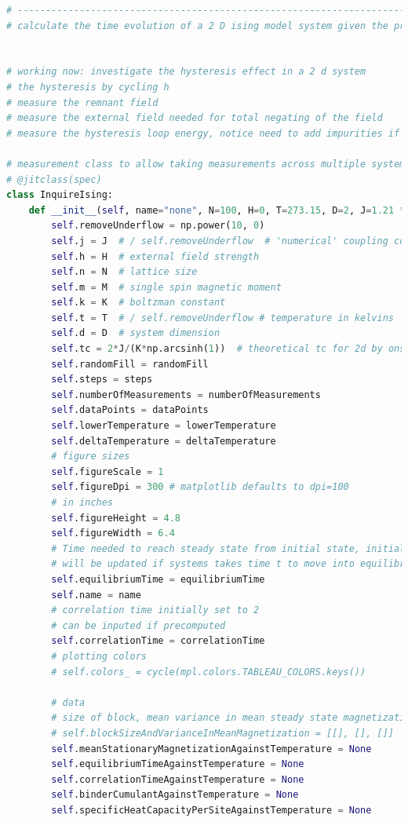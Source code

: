 \documentclass[%
showkeys,
bibnotes,
amsmath,amssymb,
floatfix,
]{revtex4-1}
\begin{document}
\begin{lstlisting}[language=Python]
# ----------------------------------------------------------------------------------------
# calculate the time evolution of a 2 D ising model system given the predefined parameters


# working now: investigate the hysteresis effect in a 2 d system
# the hysteresis by cycling h
# measure the remnant field
# measure the external field needed for total negating of the field
# measure the hysteresis loop energy, notice need to add impurities if you want a considerable amount of area enclosed

# measurement class to allow taking measurements across multiple systems
# @jitclass(spec)
class InquireIsing:
    def __init__(self, name="none", N=100, H=0, T=273.15, D=2, J=1.21 * np.power(10.0, -21), randomFill=True, K=1.38064852 * np.power(10.0, -23), M=2.22 * np.power(10.0, (-23)), correlationTime=20, equilibriumTime=0, steps=1500, numberOfMeasurements=15, dataPoints=10, lowerTemperature=20, deltaTemperature = 20):
        self.removeUnderflow = np.power(10, 0)
        self.j = J  # / self.removeUnderflow  # 'numerical' coupling constant
        self.h = H  # external field strength
        self.n = N  # lattice size
        self.m = M  # single spin magnetic moment
        self.k = K  # boltzman constant
        self.t = T  # / self.removeUnderflow # temperature in kelvins
        self.d = D  # system dimension
        self.tc = 2*J/(K*np.arcsinh(1))  # theoretical tc for 2d by onsanger
        self.randomFill = randomFill
        self.steps = steps
        self.numberOfMeasurements = numberOfMeasurements
        self.dataPoints = dataPoints
        self.lowerTemperature = lowerTemperature
        self.deltaTemperature = deltaTemperature
        # figure sizes
        self.figureScale = 1
        self.figureDpi = 300 # matplotlib defaults to dpi=100
        # in inches
        self.figureHeight = 4.8
        self.figureWidth = 6.4
        # Time needed to reach steady state from initial state, initially set to zero
        # will be updated if systems takes time t to move into equilibrium
        self.equilibriumTime = equilibriumTime
        self.name = name
        # correlation time initially set to 2
        # can be inputed if precomputed
        self.correlationTime = correlationTime
        # plotting colors
        # self.colors_ = cycle(mpl.colors.TABLEAU_COLORS.keys())

        # data
        # size of block, mean variance in mean steady state magnetization, variance in the variance
        # self.blockSizeAndVarianceInMeanMagnetization = [[], [], []]
        self.meanStationaryMagnetizationAgainstTemperature = None
        self.equilibriumTimeAgainstTemperature = None
        self.correlationTimeAgainstTemperature = None
        self.binderCumulantAgainstTemperature = None
        self.specificHeatCapacityPerSiteAgainstTemperature = None


\end{lstlisting}
\end{document}
